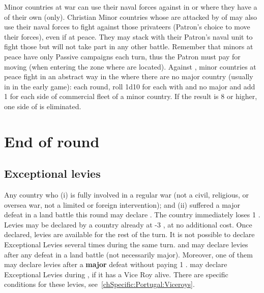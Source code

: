 \bparag Minor countries at war can use their naval forces against \corsaire in
\STZ or \CTZ where they have a \TradeFLEET of their own (only).
\bparag Christian Minor countries whose \TradeFLEET are attacked by \corsaire
of \Barbaresques may also use their naval forces to fight against those
privateers (Patron's choice to move their forces), even if at peace. They may
stack with their Patron's naval unit to fight those \corsaire but will not
take part in any other battle.
\bparag Remember that minors at peace have only Passive campaigns each turn,
thus the Patron must pay for moving (when entering the zone where \corsaire
are located).
\bparag Against , minor countries at peace fight in an abstract
way in the \STZ where there are no major country \TradeFLEET (usually in
 in the early game): each round, roll 1d10 for each \STZ with
 \corsaire and no major \TradeFLEET and add 1 for each side of
commercial fleet of a minor country.  If the result is 8 or higher, one
side of \corsaire is eliminated.

\section{End of round}
\label{chMilitary:End of round}
\subsection{Exceptional levies}
\label{chMilitary:Exceptional Levies}

\bparag Any country who (i) is fully involved in a regular war (not a civil,
religious, or oversea war, not a limited or foreign intervention); and (ii)
suffered a major defeat in a land battle this round may declare
.
\bparag The country immediately loses 1 \STAB. Levies may be declared by a
country already at -3 \STAB, at no additional cost.
\bparag Once declared, levies are available for the rest of the turn. It is
not possible to declare Exceptional Levies several times during the same
turn.
\bparag[Exception:] \SUE and \PRU may declare levies after any defeat in a land
battle (not necessarily major). Moreover, one of them may declare levies after
a \textbf{major} defeat without paying 1 \STAB.
\bparag[Exception:] \POR may declare Exceptional Levies during , if it has a Vice Roy alive. There are specific conditions for these
levies, see~\ref{chSpecific:Portugal:Viceroys}.

